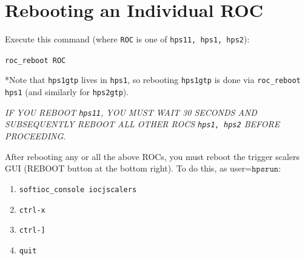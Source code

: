 \documentclass[12pt]{article}
\begin{document}
%
%
%
%



\section{Rebooting an Individual ROC}\label{sec:rebootaroc}
Execute this command (where \texttt{ROC} is one of \texttt{hps11, hps1, hps2}):\newline
\centerline{\texttt{roc\_reboot ROC}}

\vspace{5mm}\noindent
*Note that \texttt{hps1gtp} lives in \texttt{hps1}, so rebooting \texttt{hps1gtp} is done via \texttt{roc\_reboot hps1} (and similarly for \texttt{hps2gtp}).

\vspace{5mm}\noindent
{\em IF YOU REBOOT \texttt{hps11}, YOU MUST WAIT 30 SECONDS AND SUBSEQUENTLY REBOOT ALL OTHER ROCS \texttt{hps1, hps2} BEFORE PROCEEDING}.

After rebooting any or all the above ROCs, you must reboot the trigger scalers GUI (REBOOT button at the bottom right).  To do this, as user=$\texttt{hpsrun}$:
    \begin{enumerate}
      \item    \texttt{softioc\_console iocjscalers}
      \item    \texttt{ctrl-x}
      \item    \texttt{ctrl-]}
      \item    \texttt{quit}
    \end{enumerate}
        
\end{document}

